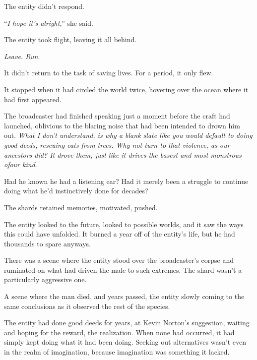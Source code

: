 The entity didn't respond.



``\emph{I hope it's alright},'' she said.



The entity took flight, leaving it all behind.



\emph{Leave.  Run}.



It didn't return to the task of saving lives.  For a period, it only flew.



It stopped when it had circled the world twice, hovering over the ocean where it had first appeared.



The broadcaster had finished speaking just a moment before the craft had launched, oblivious to the blaring noise that had been intended to drown him out.  \emph{What I don't understand, is why a blank slate like you would default to doing good deeds, rescuing cats from trees.  Why not turn to that violence, as our ancestors did?  It drove them, just like it drives the basest and most monstrous of}\emph{our kind}.



Had he known he had a listening ear?  Had it merely been a struggle to continue doing what he'd instinctively done for decades?



The shards retained memories, motivated, pushed.



The entity looked to the future, looked to possible worlds, and it saw the ways this could have unfolded.  It burned a year off of the entity's life, but he had thousands to spare anyways.



There was a scene where the entity stood over the broadcaster's corpse and ruminated on what had driven the male to such extremes.  The shard wasn't a particularly aggressive one.



A scene where the man died, and years passed, the entity slowly coming to the same conclusions as it observed the rest of the species.



The entity had done good deeds for years, at Kevin Norton's suggestion, waiting and hoping for the reward, the realization.  When none had occurred, it had simply kept doing what it had been doing.  Seeking out alternatives wasn't even in the realm of imagination, because imagination was something it lacked.



